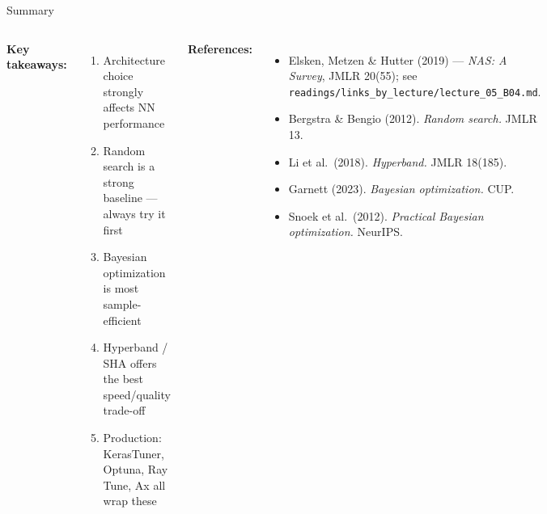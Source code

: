 \documentclass[aspectratio=169,11pt]{beamer}
\newcommand{\emphc}[1]{\textcolor{harvardcrimson}{#1}}
\begin{document}
\begin{frame}{Summary}
\begin{columns}[T]
\textbf{Key takeaways:}
\begin{enumerate}
    \item Architecture choice \emphc{strongly} affects NN performance
    \item Random search is a strong baseline --- always try it first
    \item Bayesian optimization is most sample-efficient
    \item Hyperband / SHA offers the best speed/quality trade-off
    \item Production: KerasTuner, Optuna, Ray Tune, Ax all wrap these
\end{enumerate}

\textbf{References:}
{\scriptsize
\begin{itemize}\itemsep0pt
    \item \emphc{Elsken, Metzen \& Hutter (2019)} --- \emph{NAS: A Survey}, JMLR 20(55); see \texttt{readings/links\_by\_lecture/lecture\_05\_B04.md}.
    \item Bergstra \& Bengio (2012). \emph{Random search.} JMLR 13.
    \item Li et al.\ (2018). \emph{Hyperband.} JMLR 18(185).
    \item Garnett (2023). \emph{Bayesian optimization.} CUP.
    \item Snoek et al.\ (2012). \emph{Practical Bayesian optimization.} NeurIPS.
\end{itemize}
}
\end{columns}

\end{frame}
\end{document}

